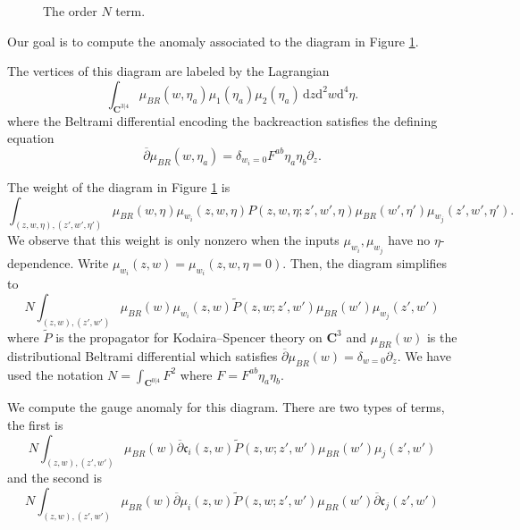 \documentclass[11pt]{amsart}
\newcommand{\dbar}{\br{\partial}}
\newcommand{\del}{\partial}
\newcommand{\til}{\widetilde}
\newcommand{\br}{\overline}
\newcommand{\CC}{\mathbf C}
\newcommand{\mf}{\mathfrak}
\renewcommand{\d}{\mathrm{d}}
\newcommand\beqn{\begin{equation}}
\newcommand\eeqn{\end{equation}}
\theoremstyle{thm}
\numberwithin{equation}{subsection}
\theoremstyle{def}
\theoremstyle{rem}
\newcommand{\fc}{\mf{c}}
\begin{document}
\begin{figure}
	\label{fig:orderN}
	\caption{The order $N$ term.}  
\end{figure}

Our goal is to compute the anomaly associated to the diagram in Figure \ref{fig:orderN}.

The vertices of this diagram are labeled by the Lagrangian
\[
\int_{\CC^{3|4}} \mu_{BR} (w,\eta_a) \mu_1(\eta_a) \mu_2(\eta_a) \, \d z \d^2 w \d^4 \eta .
\]
where the Beltrami differential encoding the backreaction satisfies the defining equation
\[
\dbar \mu_{BR} (w,\eta_a) = \delta_{w_i=0} F^{ab} \eta_a \eta_b \partial_z  .
\]

The weight of the diagram in Figure \ref{fig:orderN} is 
\beqn
\int_{(z,w,\eta), (z',w', \eta')} \mu_{BR} (w,\eta) \mu_{w_i}(z,w,\eta) P(z , w, \eta ; z', w', \eta) \mu_{BR}(w',\eta') \mu_{w_j}(z',w',\eta') .
\eeqn
We observe that this weight is only nonzero when the inputs $\mu_{w_i}, \mu_{w_j}$ have no $\eta$-dependence.
Write $\mu_{w_i}(z,w) = \mu_{w_i}(z,w,\eta=0)$. 
Then, the diagram simplifies to 
\beqn
N \int_{(z,w), (z',w')} \mu_{BR} (w) \mu_{w_i}(z,w) \til P(z , w ; z', w') \mu_{BR}(w') \mu_{w_j}(z',w') 
\eeqn
where $\til P$ is the propagator for Kodaira--Spencer theory on $\CC^3$ and $\mu_{BR}(w)$ is the distributional Beltrami differential which satisfies $\dbar \mu_{BR} (w) = \delta_{w=0} \del_z$.
We have used the notation $N = \int_{\CC^{0|4}} F^2$ where $F = F^{ab} \eta_a \eta_b$. 

We compute the gauge anomaly for this diagram. 
There are two types of terms, the first is
\beqn\label{loop1}
N \int_{(z,w), (z',w')} \mu_{BR} (w) \dbar \fc_{i}(z,w) \til P(z , w ; z', w') \mu_{BR}(w') \mu_{j}(z',w') 
\eeqn
and the second is 
\beqn\label{loop2}
N \int_{(z,w), (z',w')} \mu_{BR} (w) \dbar \mu_{i}(z,w) \til P(z , w ; z', w') \mu_{BR}(w') \dbar \fc_{j}(z',w') 
\eeqn
\end{document}
